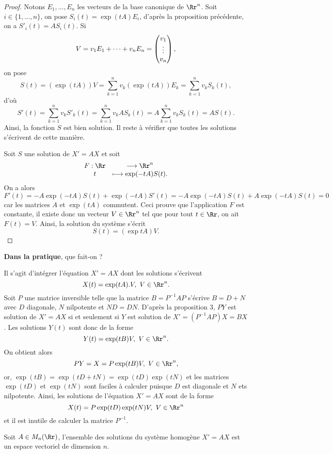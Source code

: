 \documentclass[class=report,crop=false]{standalone}
\begin{document}
\begin{proof}
Notons $E_1,\dots,E_n$ les vecteurs de la base canonique de $\Rr^n$. Soit $i\in\{1,\dots,n\}$, on pose 
$S_i(t)=\exp(tA)E_i$, d'après la proposition précédente, on a $S'_i(t)=AS_i(t)$. Si 
$$V=v_1 E_1+\cdots+ v_nE_n=\left(\begin{matrix}v_1\cr\vdots\cr v_n\end{matrix}\right),$$
on pose
$$S(t)=(\exp(tA))V=\sum_{k=1}^n v_k(\exp(tA))E_k=\sum_{k=1}^n v_kS_k(t),$$
d'où
$$S'(t)=\sum_{k=1}^n v_kS'_k(t)=\sum_{k=1}^n v_kAS_k(t)=A\sum_{k=1}^n v_kS_k(t)=AS(t).$$
Ainsi, la fonction $S$ est bien solution. Il reste à vérifier que toutes les solutions s'écrivent de cette manière.

Soit $S$ une solution de $X'=AX$ et soit 
$$\begin{array}{cc}F: \Rr&\longrightarrow\Rr^n\cr t&\longmapsto \exp(-tA)S(t).\end{array}$$
On a alors
$$F'(t)=-A\exp(-tA)S(t)+\exp(-tA)S'(t) =-A\exp(-tA)S(t)+A\exp(-tA)S(t)=0$$ 
car les matrices $A$ et $\exp(tA)$ commutent. Ceci prouve que l'application $F$ est constante, il existe donc un vecteur $V\in\Rr^n$ tel que pour tout $t\in\Rr$, on ait $F(t)=V$. Ainsi, la solution du système s'écrit
$$S(t)=(\exp tA)V.$$
\end{proof}




{\bf Dans la pratique}, que fait-on ?

Il s'agit d'intégrer l'équation $X'=AX$ dont les solutions s'écrivent $$X(t)=\exp(tA).V,\ V\in\Rr^n.$$ Soit $P$ une matrice inversible telle que la matrice $B=P^{-1}AP$ s'écrive $B=D+N$ avec $D$ diagonale, $N$ nilpotente et $ND=DN$. D'après la proposition 3, $PY$ est solution de $X'=AX$ si et seulement si $Y$ est solution de $X'=(P^{-1}AP)X=BX$. Les solutions  $Y(t)$ sont donc de la forme $$Y(t)=\exp(tB)V,\  V\in\Rr^n.$$
On obtient alors $$PY=X=P\exp(tB)V,\ V\in\Rr^n,$$
or, $\exp(tB)=\exp(tD+tN)=\exp(tD)\exp(tN)$ et les matrices $\exp(tD)$ et $\exp(tN)$ sont faciles à calculer puisque $D$ est diagonale et $N$ ets nilpotente. Ainsi, les solutions de l'équation $X'=AX$ sont de la forme
$$X(t)=P\exp(tD)\exp(tN)V,\ V\in\Rr^n$$
et il est inutile de calculer la matrice $P^{-1}$.



\begin{proposition}
Soit $A\in M_n(\Rr)$, l'ensemble des solutions du système homogène $X'=AX$
est un espace vectoriel de dimension $n$.
\end{proposition} 
\end{document}
